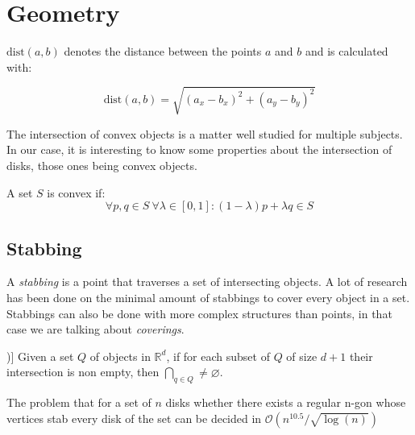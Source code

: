 \section{Geometry}
\label{sec:geom}

\begin{defn}
  $\text{dist}(a,b)$ denotes the distance between the points $a$ and $b$ and is calculated with:

  $$\text{dist}(a,b) = \sqrt{(a_x - b_x)^2 + (a_y - b_y)^2}$$
\end{defn}

The intersection of convex objects is a matter well studied for multiple
subjects. In our case, it is interesting to know some properties about
the intersection of disks, those ones being convex objects.

A set $S$ is convex if:
$$\forall p,q \in S\  \forall \lambda \in [0,1]: (1-\lambda)p + \lambda q \in S$$

\subsection{Stabbing}
A \textit{stabbing} is a point that traverses a set of intersecting objects. A lot of
research has been done \cite{schlipf2013stabbing} on the minimal amount of stabbings to
cover every object in a set. Stabbings can also be done with more complex structures
than points, in that case we are talking about \textit{coverings}.

\begin{theorem}[Helly (\cite[Helly1923175])]
  Given a set $Q$ of objects in $\mathbb{R}^d$, if for each subset of $Q$ of
  size $d+1$ their intersection is non empty, then $\bigcap_{q \in Q} \neq
  \varnothing$. \cite{Helly1923175}
\end{theorem}

\begin{theorem}
  The problem that for a set of $n$ disks whether there exists a regular n-gon
  whose vertices stab every disk of the set can be decided in $\mathcal{O}(n^{10.5} / \sqrt{\log(n)})$ \cite{schlipf2013stabbing}
\end{theorem}

